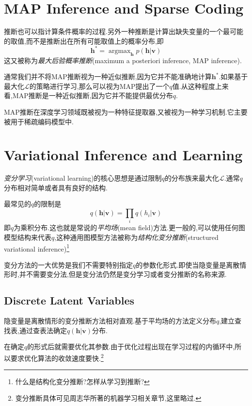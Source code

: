 \section{MAP Inference and Sparse Coding}

推断也可以指计算条件概率的过程.另外一种推断是计算出缺失变量的一个最可能的取值,而不是推断出在所有可能取值上的概率分布,即
\begin{equation}
\bm h^\ast=\mathop{\arg\max}_{\bm h}p(\bm{h|v})
\end{equation}
这又被称为\textit{最大后验概率推断}(maximum a posteriori inference, MAP inference).

通常我们并不将MAP推断视为一种近似推断,因为它并不能准确地计算$\bm h^\ast$.如果基于最大化$\mathcal L$的策略进行学习,那么可以视为MAP提出了一个$q$值.从这种程度上来看,MAP推断是一种近似推断,因为它并不能提供最优分布$q$.

MAP推断在深度学习领域既被视为一种特征提取器,又被视为一种学习机制.它主要被用于稀疏编码模型中.

\section{Variational Inference and Learning}

\textit{变分学习}(variational learning)的核心思想是通过限制$q$的分布族来最大化$\mathcal L$.通常$q$分布相对简单或者具有良好的结构.

最常见的$q$的限制是
\begin{equation}
q(\bm{h|v})=\prod_iq(h_i|\bm v)
\end{equation}
即$q$为乘积分布.这也就是常说的\textit{平均场}(mean field)方法.更一般的,可以使用任何图模型结构来代表$q$,这种通用图模型方法被称为\textit{结构化变分推断}(structured variational inference)\footnote{什么是结构化变分推断?怎样从学习到推断?}

变分方法的一大优势是我们不需要特别指定$q$的参数化形式.即使当隐变量是离散情形时,并不需要变分法,但是变分法仍然是变分学习或者变分推断的名称来源.

\subsection{Discrete Latent Variables}

隐变量是离散情形的变分推断方法相对直观.基于平均场的方法定义分布$q$,建立查找表,通过查表法确定$q(\bm{h|v})$分布.

在确定$q$的形式后就需要优化其参数.由于优化过程出现在学习过程的内循环中,所以要求优化算法的收敛速度要快.\footnote{变分推断具体可见周志华所著的机器学习相关章节,这里略过.}

